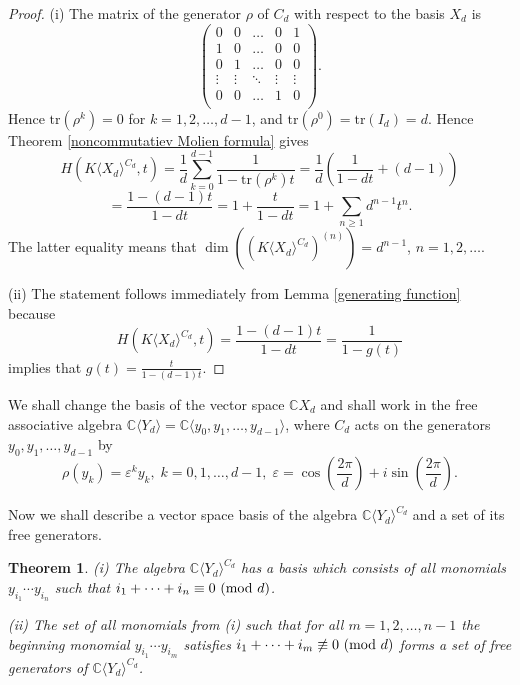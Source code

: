\documentclass{amsart}
\newtheorem{theorem}{Theorem}[section]
\theoremstyle{definition}
\begin{document}
\begin{proof}
(i) The matrix of the generator $\rho$ of $C_d$ with respect to the basis $X_d$ is
\[
\begin{pmatrix}
0& 0 &\dots &0&1\\
1& 0 &\dots &0&0\\
0& 1 &\dots &0&0\\
\vdots&\vdots&\ddots&\vdots&\vdots\\
0& 0 &\dots &1&0\\
\end{pmatrix}.
\]
Hence $\text{tr}(\rho^k)=0$ for $k=1,2,\ldots,d-1$, and $\text{tr}(\rho^0)=\text{tr}(I_d)=d$. Hence Theorem \ref{noncommutatiev Molien formula} gives
\[
H(K\langle X_d\rangle^{C_d},t)=\frac{1}{d}\sum_{k=0}^{d-1}\frac{1}{1-\text{tr}(\rho^k)t}=\frac{1}{d}\left(\frac{1}{1-dt}+(d-1)\right)
\]
\[
=\frac{1-(d-1)t}{1-dt}=1+\frac{t}{1-dt}=1+\sum_{n\geq 1}d^{n-1}t^n.
\]
The latter equality means that $\dim\left((K\langle X_d\rangle^{C_d})^{(n)}\right)=d^{n-1}$, $n=1,2,\ldots$.

(ii) The statement follows immediately from Lemma \ref{generating function} because
\[
H(K\langle X_d\rangle^{C_d},t)=\frac{1-(d-1)t}{1-dt}=\frac{1}{1-g(t)}
\]
implies that $\displaystyle g(t)=\frac{t}{1-(d-1)t}$.
\end{proof}

We shall change the basis of the vector space ${\mathbb C}X_d$ and shall work in the free associative algebra
${\mathbb C}\langle Y_d\rangle={\mathbb C}\langle y_0,y_1,\ldots,y_{d-1}\rangle$,
where $C_d$ acts on the generators $y_0,y_1,\ldots,y_{d-1}$ by
\[
\rho(y_k)=\varepsilon^ky_k,\; k=0,1,\ldots,d-1,\; \varepsilon=\cos\left(\frac{2\pi}{d}\right)+i\sin\left(\frac{2\pi}{d}\right).
\]

Now we shall describe a vector space basis of the algebra ${\mathbb C}\langle Y_d\rangle^{C_d}$ and a set of its free generators.

\begin{theorem}\label{description of algebra of invariants}
{\rm (i)} The algebra ${\mathbb C}\langle Y_d\rangle^{C_d}$ has a basis which consists of all monomials
$y_{i_1}\cdots y_{i_n}$ such that $i_1+\cdots+i_n\equiv 0\text{ \rm (mod }d)$.

{\rm (ii)} The set of all monomials from {\rm (i)}
such that for all $m=1,2,\ldots,n-1$ the beginning monomial $y_{i_1}\cdots y_{i_m}$ satisfies $i_1+\cdots+i_m\not\equiv 0\text{ \rm (mod }d)$
forms a set of free generators of ${\mathbb C}\langle Y_d\rangle^{C_d}$.
\end{theorem}
\end{document}
